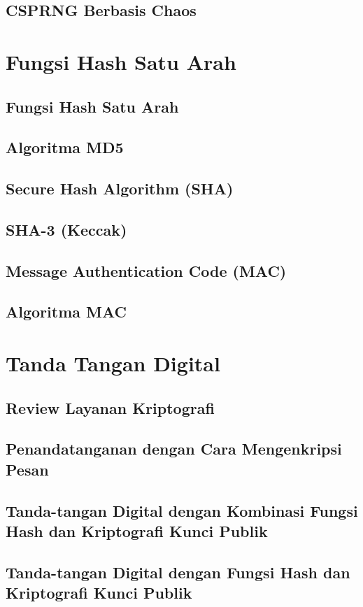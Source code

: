 \documentclass{book}
\begin{document}
    \section{CSPRNG Berbasis Chaos}     
\chapter{Fungsi Hash Satu Arah}
     \section{Fungsi Hash Satu Arah}
     \section{Algoritma MD5}
     \section{Secure Hash Algorithm (SHA)}
     \section{SHA-3 (Keccak)}
     \section{Message Authentication Code (MAC)}
     \section{Algoritma MAC}
\chapter{Tanda Tangan Digital}
     \section{Review Layanan Kriptografi}
     \section{Penandatanganan dengan Cara Mengenkripsi Pesan}
     \section{Tanda-tangan Digital dengan Kombinasi Fungsi Hash dan Kriptografi Kunci Publik}
     \section{Tanda-tangan Digital dengan Fungsi Hash dan Kriptografi Kunci Publik}
\end{document}
